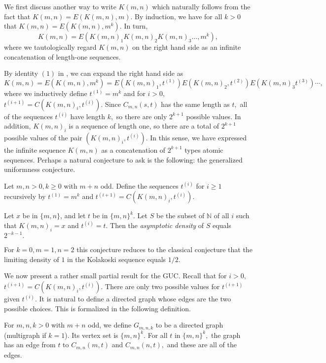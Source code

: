 \documentclass[11pt]{amsart} %
\begin{document}
We first discuss another way to write $K(m, n)$ which naturally follows from the fact that $K(m, n) = E(K(m, n), m).$ By induction, we have for all $k>0$ that $ K(m, n) = E(K(m, n), m^k).$ In turn, 
\[ K(m, n) = E(K(m, n)_1 K(m, n)_2 K(m, n)_3 \ldots, m^k),\] where we tautologically regard $K(m, n)$ on the right hand side as an infinite concatenation of length-one sequences.

By identity $(1)$ in \cite{Shen}, we can expand the right hand side as 
\[K(m, n) =  E(K(m, n), m^k) = E(K(m, n)_1, t^{(1)}) E(K(m, n)_2, t^{(2)})E(K(m, n)_3 t^{(3)}) \cdots, \]
where we inductively define $t^{(1)} = m^k$ and for $i>0,$ $t^{(i+1)} = C(K(m, n)_i, t^{(i)}).$ Since $C_{m, n}(s, t)$ has the same length as $t,$ all of the sequences $t^{(i)}$ have length $k,$ so there are only $2^{k+1}$ possible values. In addition, $K(m, n)_i$ is a sequence of length one, so there are a total of $2^{k+1}$ possible values of the pair $(K(m, n)_i, t^{(i)}).$ In this sense, we have expressed the infinite sequence $K(m, n)$ as a concatenation of $2^{k+1}$ types atomic sequences. Perhaps a natural conjecture to ask is the following: the generalized uniformness conjecture.

\begin{conjecture} \label{uniform}  Let $m, n>0, k \ge 0$ with $m+n$ odd. Define the sequences $t^{(i)}$ for $i \ge 1$ recursively by $t^{(1)} = m^k$ and $t^{(i+1)} = C(K(m, n)_i, t^{(i)}).$ 

 Let $x$ be in $\{m, n\}$, and let $t$ be in $\{m, n\}^k.$ Let $S$ be the subset of $\mathbb{N}$ of all $i$ such that $K(m, n)_i = x$ and $t^{(i)} = t.$ Then the \textit{asymptotic density} of $S$ equals $2^{-k-1}.$  
 \end{conjecture}

For $k=0, m = 1, n = 2$ this conjecture reduces to the classical conjecture that the limiting density of $1$ in the Kolakoski sequence equals $1/2.$

We now present a rather small partial result for the GUC. Recall that  for $i>0,$ $t^{(i+1)} = C(K(m, n)_i, t^{(i)}).$ There are only two possible values for $t^{(i+1)}$ given $t^{(i)}.$ It is natural to define a directed graph whose edges are the two possible choices. This is formalized in the following definition.

\begin{definition} For $m, n, k > 0$ with $m+n$ odd, we define $G_{m, n, k}$ to be a directed graph (multigraph if $k = 1$). Its vertex set is $\{m, n\}^k.$ For all $t$ in $\{m, n\}^k,$ the graph has an edge from $t$ to $C_{m, n}(m, t)$ and $C_{m, n}(n, t),$ and these are all of the edges. \end{definition}
\end{document}
